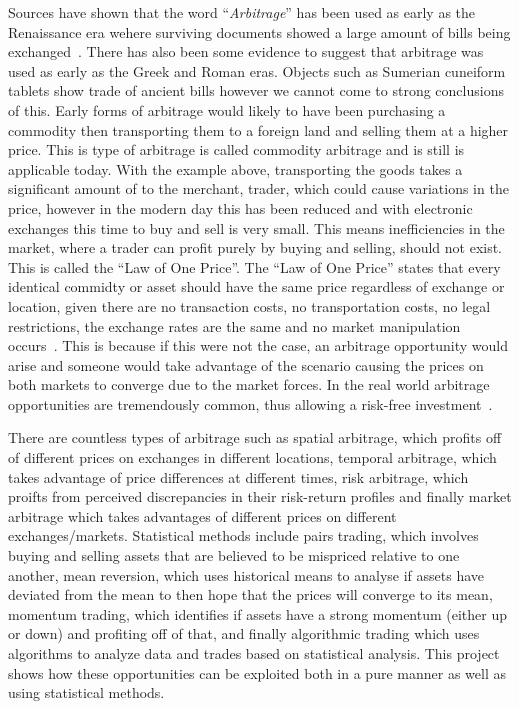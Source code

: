 Sources have shown that the word ``\textit{Arbitrage}'' has been used as early as the Renaissance era wehere surviving documents showed a large amount of bills being exchanged~\cite{poitras_2021}. There has also been some evidence to suggest that arbitrage was used as early as the Greek and Roman eras. Objects such as Sumerian cuneiform tablets show trade of ancient bills however we cannot come to strong conclusions of this. Early forms of arbitrage would likely to have been purchasing a commodity then transporting them to a foreign land and selling them at a higher price. This is type of arbitrage is called commodity arbitrage and is still is applicable today. With the example above, transporting the goods takes a significant amount of to the merchant, trader, which could cause variations in the price, however in the modern day this has been reduced and with electronic exchanges this time to buy and sell is very small. This means inefficiencies in the market, where a trader can profit purely by buying and selling, should not exist. This is called the ``Law of One Price''. The ``Law of One Price'' states that every identical commidty or asset should have the same price regardless of exchange or location, given there are no transaction costs, no transportation costs, no legal restrictions, the exchange rates are the same and no market manipulation occurs~\cite{noauthor_law_nodate}. This is because if this were not the case, an arbitrage opportunity would arise and someone would take advantage of the scenario causing the prices on both markets to converge due to the market forces. In the real world arbitrage opportunities are tremendously common, thus allowing a risk-free investment~\cite{10.2307/1828075, RICHARDSON1978341}.

There are countless types of arbitrage such as spatial arbitrage, which profits off of different prices on exchanges in different locations, temporal arbitrage, which takes advantage of price differences at different times, risk arbitrage, which proifts from perceived discrepancies in their risk-return profiles and finally market arbitrage which takes advantages of different prices on different exchanges/markets. Statistical methods include pairs trading, which involves buying and selling assets that are believed to be mispriced relative to one another, mean reversion, which uses historical means to analyse if assets have deviated from the mean to then hope that the prices will converge to its mean, momentum trading, which identifies if assets have a strong momentum (either up or down) and profiting off of that, and finally algorithmic trading which uses algorithms to analyze data and trades based on statistical analysis. This project shows how these opportunities can be exploited both in a pure manner as well as using statistical methods.

